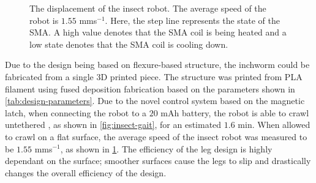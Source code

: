 \begin{figure}[hbt!] %
  \centering
  \resizebox{0.9\columnwidth}{!}{}
  \caption{The displacement of the insect robot. The average speed of the robot is $1.55$ mms$^{-1}$. Here, the step line represents the state of the SMA. A high value denotes that the SMA coil is being heated and a low state denotes that the SMA coil is cooling down.}
  \label{fig:insect-disp}
\end{figure}

Due to the design being based on flexure-based structure, the inchworm could be fabricated from a single 3D printed piece. The structure was printed from PLA filament using fused deposition fabrication based on the parameters shown in \cref{tab:design-parameters}. Due to the novel control system based on the magnetic latch, when connecting the robot to a $20$ mAh battery, the robot is able to crawl untethered , as shown in \cref{fig:insect-gait}, for an estimated $1.6$ min. When allowed to crawl on a flat surface, the average speed of the insect robot was measured to be $1.55$ mms$^{-1}$, as shown in \cref{fig:insect-disp}. The efficiency of the leg design is highly dependant on the surface; smoother surfaces cause the legs to slip and drastically changes the overall efficiency of the design.

